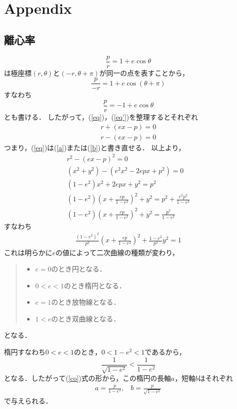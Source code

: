\documentclass[12pt]{jsarticle}
\begin{document}
	\section{Appendix}
	\subsection{離心率}
	\begin{equation}
	\frac{p}{r} = 1 + e\cos{\theta} \label{eq}
	\end{equation}
	は極座標$(r, \theta)$と$(-r, \theta+\pi)$が同一の点を表すことから，
	\[
	\frac{p}{-r} = 1 + e\cos{(\theta + \pi)}
	\]
	すなわち
	\begin{equation}
	\frac{p}{r} = -1 + e\cos{\theta} \label{eq'}
	\end{equation}
	とも書ける．
	したがって，(\ref{eq})，(\ref{eq'})を整理するとそれぞれ
	\begin{align}
	r + (ex - p) = 0 \label{a} \\
	r - (ex - p) = 0 \label{b}
	\end{align}
	つまり，(\ref{eq})は(\ref{a})または(\ref{b})と書き直せる．
	以上より，
	\begin{align*}
	r^2 - (ex-p)^2 = 0 \\
	(x^2 + y^2) - (e^2x^2 - 2epx +p^2) = 0 \\
	(1-e^2)x^2 + 2epx + y^2 = p^2 \\
	(1-e^2)\left(x + \frac{ep}{1-e^2}\right)^2 + y^2 = p^2 + \frac{e^2p^2}{1-e^2} \\
	(1-e^2)\left(x + \frac{ep}{1-e^2}\right)^2 + y^2 = \frac{p^2}{1-e^2}
	\end{align*}
	すなわち
	\begin{align}
	\frac{(1-e^2)^2}{p^2}\left(x+\frac{ep}{1-e^2}\right)^2 + \frac{1-e^2}{p^2}y^2
	= 1 \label{co}
	\end{align}
	これは明らかに$e$の値によって二次曲線の種類が変わり，
	\begin{quote}
		\begin{itemize}
			\item $e=0$のとき円となる．
			\item $0<e<1$のとき楕円となる．
			\item $e=1$のとき放物線となる．
			\item $1<e$のとき双曲線となる．
		\end{itemize}
	\end{quote}
	となる．
	
	楕円すなわち$0<e<1$のとき，$0<1-e^2<1$であるから，
	\[
	\frac{1}{\sqrt{1-e^2}} < \frac{1}{1-e^2}
	\]
	となる．したがって(\ref{co})式の形から，この楕円の長軸$a$，短軸$b$はそれぞれ
	\begin{align*}
	a = \frac{p}{1-e^2}, \ \ \ \ b = \frac{p}{\sqrt{1-e^2}}
	\end{align*}
	で与えられる．
	
\end{document}
